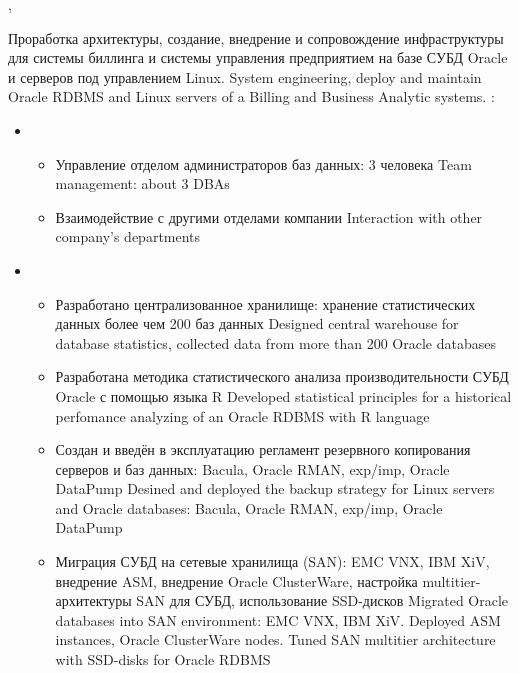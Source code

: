 \documentclass[11pt,a4paper,sans, russian]{moderncv}        %
\begin{document}
{\protect{}}
{\cityperm, \country}
{}
{
	{Проработка архитектуры, создание, внедрение и сопровождение инфраструктуры для системы биллинга и системы управления предприятием на базе СУБД Oracle и серверов под управлением Linux.}
	{System engineering, deploy and maintain Oracle RDBMS and Linux servers of a Billing and Business Analytic systems.}\newline{}
	\achievements:
	\begin{itemize}	
	\item {}	
		\begin{itemize}
			\item {}
				{Управление отделом администраторов баз данных: 3 человека}
				{Team management: about 3 DBAs}
			\item {}
				{Взаимодействие с другими отделами компании}
				{Interaction with other company's departments}
		\end{itemize}
	\item {}
		\begin{itemize}
			\item {}
				{Разработано централизованное хранилище: хранение статистических данных более чем 200 баз данных}
				{Designed central warehouse for database statistics, collected data from more than 200 Oracle databases}
			\item {}
				{Разработана методика статистического анализа производительности СУБД Oracle с помощью языка R}
				{Developed statistical principles for a historical perfomance analyzing of an Oracle RDBMS with R language}
			\item {}
				{Создан и введён в эксплуатацию регламент резервного копирования серверов и баз данных: Bacula, Oracle RMAN, exp/imp, Oracle DataPump}
				{Desined and deployed the backup strategy for Linux servers and Oracle databases: Bacula, Oracle RMAN, exp/imp, Oracle DataPump}
			\item {}
				{Миграция СУБД на сетевые хранилища (SAN): EMC VNX, IBM XiV, внедрение ASM, внедрение Oracle ClusterWare, настройка multitier-архитектуры SAN для СУБД, использование SSD-дисков}
				{Migrated Oracle databases into SAN environment: EMC VNX, IBM XiV. Deployed ASM instances, Oracle ClusterWare nodes. Tuned SAN multitier architecture with SSD-disks for Oracle RDBMS}

\end{itemize}
\end{itemize}}
\end{document}
